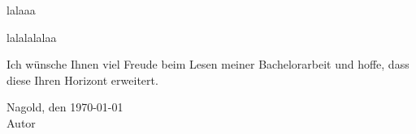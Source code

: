 	\label{sec:vorwort}
	
lalaaa

\vspace{0.5 cm}

lalalalalaa

\vspace{1 cm}

Ich wünsche Ihnen viel Freude beim Lesen meiner Bachelorarbeit und hoffe, dass diese Ihren Horizont erweitert.

\vspace{2 cm}

Nagold, den \today \\
Autor
